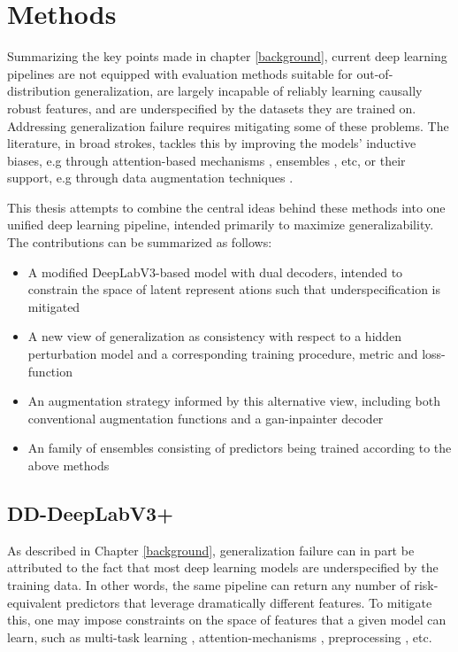 \chapter{Methods}\label{methods}
Summarizing the key points made in chapter \ref{background}, current deep learning pipelines are not equipped with evaluation methods suitable for out-of-distribution generalization, are largely incapable of reliably learning causally robust features, and are underspecified by the datasets they are trained on. Addressing generalization failure requires mitigating some of these problems. The literature, in broad strokes, tackles this by improving the models' inductive biases, e.g through attention-based mechanisms \cite{attention_generalizability, reverse_attention}, ensembles \cite{divergentnets, endoensemble}, etc, or their support, e.g through data augmentation techniques \cite{polyp_augmentation, cyclegan}. 

This thesis attempts to combine the central ideas behind these methods into one unified deep learning pipeline, intended primarily to maximize generalizability. The contributions can be summarized as follows:

\begin{itemize}
    \item A modified DeepLabV3-based model with dual decoders, intended to constrain the space of latent represent ations such that underspecification is mitigated
    \item A new view of generalization as consistency with respect to a hidden perturbation model and a corresponding training procedure, metric and loss-function
    \item An augmentation strategy informed by this alternative view, including both conventional augmentation functions and a \gls{gan}-inpainter decoder
    \item An family of ensembles consisting of predictors being trained according to the above methods
\end{itemize}



\section{DD-DeepLabV3+}
As described in Chapter \ref{background}, generalization failure can in part be attributed to the fact that most deep learning models are underspecified by the training data. In other words, the same pipeline can return any number of risk-equivalent predictors that leverage dramatically different features. To mitigate this, one may impose constraints on the space of features that a given model can learn, such as multi-task learning \cite{ddanet}, attention-mechanisms \cite{attention_generalizability, reverse_attention}, preprocessing \cite{visual_cortex}, etc. 

